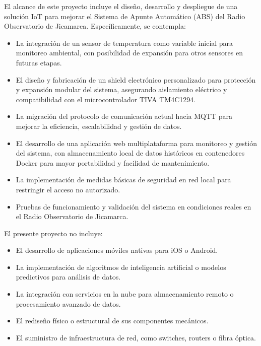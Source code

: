\documentclass[
11pt, %
]{charter}
\begin{document}
El alcance de este proyecto incluye el diseño, desarrollo y despliegue de una solución IoT para mejorar el Sistema de Apunte Automático (ABS) del Radio Observatorio de Jicamarca. Específicamente, se contempla:

\begin{itemize}
	\item La integración de un sensor de temperatura como variable inicial para monitoreo ambiental, con posibilidad de expansión para otros sensores en futuras etapas.

	\item El diseño y fabricación de un shield electrónico personalizado para protección y expansión modular del sistema, asegurando aislamiento eléctrico y compatibilidad con el microcontrolador TIVA TM4C1294.

	\item La migración del protocolo de comunicación actual hacia MQTT para mejorar la eficiencia, escalabilidad y gestión de datos.

	\item El desarrollo de una aplicación web multiplataforma para monitoreo y gestión del sistema, con almacenamiento local de datos históricos en contenedores Docker para mayor portabilidad y facilidad de mantenimiento.

	\item La implementación de medidas básicas de seguridad en red local para restringir el acceso no autorizado.

	\item Pruebas de funcionamiento y validación del sistema en condiciones reales en el Radio Observatorio de Jicamarca.
\end{itemize}

El presente proyecto no incluye:

\begin{itemize}
	\item El desarrollo de aplicaciones móviles nativas para iOS o Android.

	\item La implementación de algoritmos de inteligencia artificial o modelos predictivos para análisis de datos.

	\item La integración con servicios en la nube para almacenamiento remoto o procesamiento avanzado de datos.

	\item El rediseño físico o estructural de sus componentes mecánicos.

	\item El suministro de infraestructura de red, como switches, routers o fibra óptica.
\end{itemize}
\end{document}
